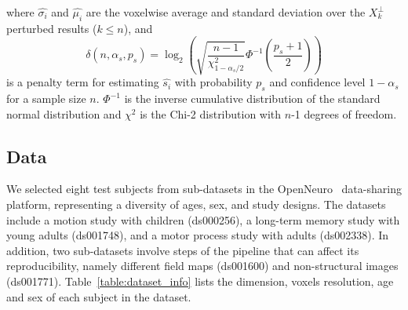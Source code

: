 \documentclass[lettersize,journal]{IEEEtran}
\begin{document}
where $\hat{\sigma_i}$ and $\hat{\mu_i}$ are the voxelwise average and standard
deviation over the $X_k^\perp$ perturbed results ($k \leq n$), and
\begin{equation}
  \delta(n, \alpha_s, p_s) = \log_2 \left( \sqrt{\frac{n-1}{\chi^2_{1-\alpha_s/2}}} \Phi^{-1} \left( \frac{p_s+1}{2} \right) \right)
\end{equation}
is a penalty term for estimating $\hat{s_i}$ with probability $p_s$ and confidence level $1-\alpha_s$ for a sample size $n$.
$\Phi^{-1}$ is the inverse cumulative distribution of the standard normal distribution and $\chi^2$ is the Chi-2 distribution with $n$-1 degrees of freedom.

\subsection{Data}
\label{subsec:data}

We selected eight test subjects from sub-datasets in the
OpenNeuro~\cite{markiewicz2021openneuro} data-sharing platform, representing a
diversity of ages, sex, and study designs. The datasets include a motion study
with children (ds000256), a long-term memory study with young adults
(ds001748), and a motor process study with adults (ds002338). In addition, two
sub-datasets involve steps of the pipeline that can affect its reproducibility,
namely different field maps (ds001600) and non-structural images (ds001771).
Table~\ref{table:dataset_info} lists the dimension, voxels resolution, age and
sex of each subject in the dataset.
\end{document}
